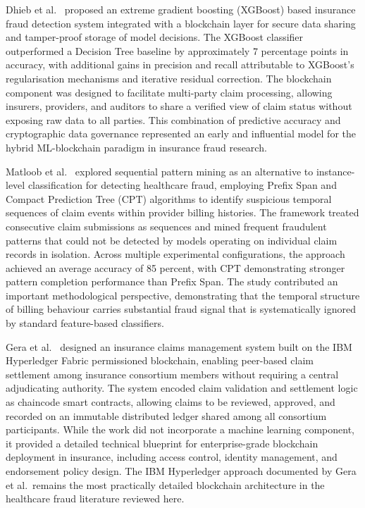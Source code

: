 Dhieb et al.\ \cite{dhieb2020} proposed an extreme gradient boosting (XGBoost) based insurance fraud detection system integrated with a blockchain layer for secure data sharing and tamper-proof storage of model decisions. The XGBoost classifier outperformed a Decision Tree baseline by approximately 7 percentage points in accuracy, with additional gains in precision and recall attributable to XGBoost's regularisation mechanisms and iterative residual correction. The blockchain component was designed to facilitate multi-party claim processing, allowing insurers, providers, and auditors to share a verified view of claim status without exposing raw data to all parties. This combination of predictive accuracy and cryptographic data governance represented an early and influential model for the hybrid ML-blockchain paradigm in insurance fraud research.

Matloob et al.\ \cite{matloob2020} explored sequential pattern mining as an alternative to instance-level classification for detecting healthcare fraud, employing Prefix Span and Compact Prediction Tree (CPT) algorithms to identify suspicious temporal sequences of claim events within provider billing histories. The framework treated consecutive claim submissions as sequences and mined frequent fraudulent patterns that could not be detected by models operating on individual claim records in isolation. Across multiple experimental configurations, the approach achieved an average accuracy of 85 percent, with CPT demonstrating stronger pattern completion performance than Prefix Span. The study contributed an important methodological perspective, demonstrating that the temporal structure of billing behaviour carries substantial fraud signal that is systematically ignored by standard feature-based classifiers.

Gera et al.\ \cite{gera2020} designed an insurance claims management system built on the IBM Hyperledger Fabric permissioned blockchain, enabling peer-based claim settlement among insurance consortium members without requiring a central adjudicating authority. The system encoded claim validation and settlement logic as chaincode smart contracts, allowing claims to be reviewed, approved, and recorded on an immutable distributed ledger shared among all consortium participants. While the work did not incorporate a machine learning component, it provided a detailed technical blueprint for enterprise-grade blockchain deployment in insurance, including access control, identity management, and endorsement policy design. The IBM Hyperledger approach documented by Gera et al.\ remains the most practically detailed blockchain architecture in the healthcare fraud literature reviewed here.

